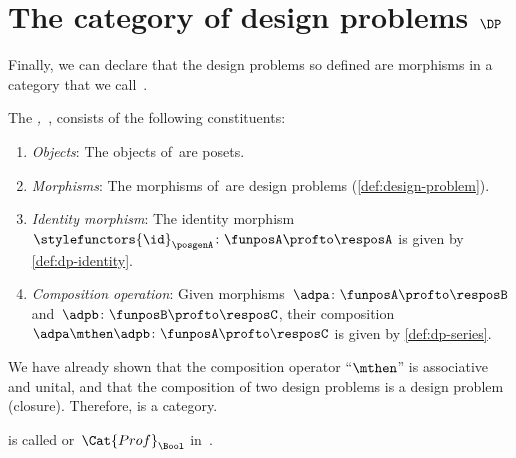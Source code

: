 
\section{The category of design problems $\DP$}

Finally, we can declare that the design problems so defined are morphisms in a category that we call~\iindex{\DP}.


\begin{definition}
    \label{def:DP}
    The \emph{,~\DP}, consists of the following constituents:
    \begin{enumerate}
        \item \emph{Objects}: The objects of~\DP are posets.
        \item \emph{Morphisms}: The morphisms of~\DP are design problems (\cref{def:design-problem}).
        \item \emph{Identity morphism}: The identity morphism~$\stylefunctors{\id}_\posgenA \colon \funposA \profto \resposA$ is given by \cref{def:dp-identity}.
        \item \emph{Composition operation}: Given morphisms~$\adpa \colon  \funposA \profto \resposB$ and~$\adpb \colon \funposB \profto \resposC$, their composition~$\adpa \mthen \adpb\colon \funposA\profto \resposC$ is given by \cref{def:dp-series}.
    \end{enumerate}
\end{definition}

We have already shown that the composition operator ``$\mthen$'' is associative and unital, and that the composition of two design problems is a design problem (closure).
Therefore, \DP is a category.

\begin{remark}
    \DP is called \feas or~$\Cat{Prof}_\Bool$ in~\cite{fong2019}.
\end{remark}

